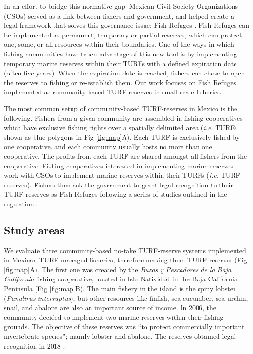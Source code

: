 \documentclass{frontiersSCNS}
\begin{document}
In an effort to bridge this normative gap, Mexican Civil Society
Organizations (CSOs) served as a link between fishers and government,
and helped create a legal framework that solves this governance issue:
Fish Refuges \citep{nom}. Fish Refuges can be implemented as permanent,
temporary or partial reserves, which can protect one, some, or all
resources within their boundaries. One of the ways in which fishing
communities have taken advantage of this new tool is by implementing
temporary marine reserves within their TURFs with a defined expiration
date (often five years). When the expiration date is reached, fishers
can chose to open the reserves to fishing or re-establish them. Our work
focuses on Fish Refuges implemented as community-based TURF-reserves in
small-scale fisheries.

The most common setup of community-based TURF-reserves in Mexico is the
following. Fishers from a given community are assembled in fishing
cooperatives which have exclusive fishing rights over a spatially
delimited area (\emph{i.e.} TURFs shown as blue polygons in Fig
\ref{fig:map}A). Each TURF is exclusively fished by one cooperative, and
each community usually hosts no more than one cooperative. The profits
from each TURF are shared amongst all fishers from the cooperative.
Fishing cooperatives interested in implementing marine reserves work
with CSOs to implement marine reserves within their TURFs (\emph{i.e.}
TURF-reserves). Fishers then ask the government to grant legal
recognition to their TURF-reserves as Fish Refuges following a series of
studies outlined in the regulation \citep{nom}.

\hypertarget{study-areas}{%
\subsection{Study areas}\label{study-areas}}

We evaluate three community-based no-take TURF-reserve systems
implemented in Mexican TURF-managed fisheries, therefore making them
TURF-reserves (Fig \ref{fig:map}A). The first one was created by the
\emph{Buzos y Pescadores de la Baja California} fishing cooperative,
located in Isla Natividad in the Baja California Peninsula (Fig
\ref{fig:map}B). The main fishery in the island is the spiny lobster
(\emph{Panulirus interruptus}), but other resources like finfish, sea
cucumber, sea urchin, snail, and abalone are also an important source of
income. In 2006, the community decided to implement two marine reserves
within their fishing grounds. The objective of these reserves was ``to
protect commercially important invertebrate species''; mainly lobster
and abalone. The reserves obtained legal recognition in 2018
\citep{dof_website_2018}.
\end{document}
